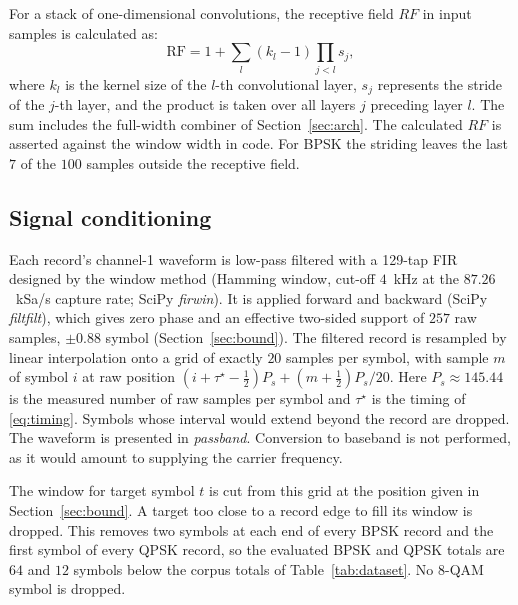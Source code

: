 \documentclass{ieeeaccess}
\begin{document}
For a stack of one-dimensional convolutions, the receptive field $RF$ in input samples is calculated as:
\begin{equation}
\mathrm{RF} = 1 + \sum_{l} (k_l - 1)\prod_{j<l} s_j ,
\label{eq:rf}
\end{equation}
where $k_l$ is the kernel size of the $l$-th convolutional layer, $s_j$ represents the stride of the $j$-th layer, and the product is taken over all layers $j$ preceding layer $l$. The sum includes the full-width combiner of Section~\ref{sec:arch}. The calculated $RF$ is asserted against the window width in code. For BPSK the striding leaves the last $7$ of the $100$ samples outside the receptive field.

\subsection{Signal conditioning}
\label{sec:conditioning}
Each record's channel-1 waveform is low-pass filtered with a 129-tap FIR
designed by the window method (Hamming window, cut-off $4$~kHz at the
$87.26$~kSa/s capture rate; SciPy \emph{firwin}). It is applied
forward and backward (SciPy \emph{filtfilt}), which gives zero phase and an
effective two-sided support of $257$ raw samples, $\pm 0.88$ symbol
(Section~\ref{sec:bound}). The filtered record is resampled by linear
interpolation onto a grid of exactly $20$ samples per symbol, with sample $m$
of symbol $i$ at raw position $(i+\tau^{\star}-\tfrac12)P_s +
(m+\tfrac12)P_s/20$. Here $P_s \approx 145.44$ is the measured number of raw
samples per symbol and $\tau^{\star}$ is the timing of \eqref{eq:timing}.
Symbols whose interval would extend beyond the record are dropped. The
waveform is presented in \emph{passband}. Conversion to baseband is not
performed, as it would amount to supplying the carrier frequency.

The window for target symbol $t$ is cut from this grid at the position given in
Section~\ref{sec:bound}. A target too close to a record edge to fill its window
is dropped. This removes two symbols at each end of every BPSK record and the
first symbol of every QPSK record, so the evaluated BPSK and QPSK totals are $64$
and $12$ symbols below the corpus totals of Table~\ref{tab:dataset}. No 8-QAM
symbol is dropped.
\end{document}
